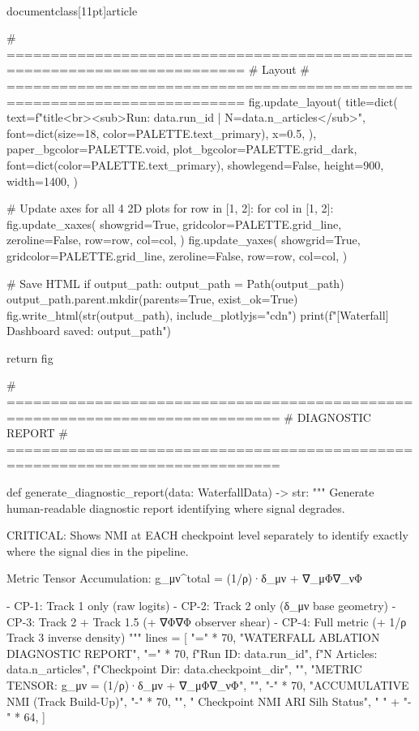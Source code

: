 \\documentclass[11pt]{article}
\begin{document}
\begin{CodeBlock}
    # =========================================================================
    # Layout
    # =========================================================================
    fig.update_layout(
        title=dict(
            text=f"{title}<br><sub>Run: {data.run_id} | N={data.n_articles}</sub>",
            font=dict(size=18, color=PALETTE.text_primary),
            x=0.5,
        ),
        paper_bgcolor=PALETTE.void,
        plot_bgcolor=PALETTE.grid_dark,
        font=dict(color=PALETTE.text_primary),
        showlegend=False,
        height=900,
        width=1400,
    )

    # Update axes for all 4 2D plots
    for row in [1, 2]:
        for col in [1, 2]:
            fig.update_xaxes(
                showgrid=True,
                gridcolor=PALETTE.grid_line,
                zeroline=False,
                row=row,
                col=col,
            )
            fig.update_yaxes(
                showgrid=True,
                gridcolor=PALETTE.grid_line,
                zeroline=False,
                row=row,
                col=col,
            )

    # Save HTML
    if output_path:
        output_path = Path(output_path)
        output_path.parent.mkdir(parents=True, exist_ok=True)
        fig.write_html(str(output_path), include_plotlyjs="cdn")
        print(f"[Waterfall] Dashboard saved: {output_path}")

    return fig


# =============================================================================
# DIAGNOSTIC REPORT
# =============================================================================

def generate_diagnostic_report(data: WaterfallData) -> str:
    """
    Generate human-readable diagnostic report identifying where signal degrades.

    CRITICAL: Shows NMI at EACH checkpoint level separately to identify
    exactly where the signal dies in the pipeline.

    Metric Tensor Accumulation:
    g_μν^total = (1/ρ)·δ_μν + ∇_μΦ∇_νΦ

    - CP-1: Track 1 only (raw logits)
    - CP-2: Track 2 only (δ_μν base geometry)
    - CP-3: Track 2 + Track 1.5 (+ ∇Φ∇Φ observer shear)
    - CP-4: Full metric (+ 1/ρ Track 3 inverse density)
    """
    lines = [
        "=" * 70,
        "WATERFALL ABLATION DIAGNOSTIC REPORT",
        "=" * 70,
        f"Run ID: {data.run_id}",
        f"N Articles: {data.n_articles}",
        f"Checkpoint Dir: {data.checkpoint_dir}",
        "",
        "METRIC TENSOR: g_μν = (1/ρ)·δ_μν + ∇_μΦ∇_νΦ",
        "",
        "-" * 70,
        "ACCUMULATIVE NMI (Track Build-Up)",
        "-" * 70,
        "",
        "  Checkpoint                       NMI      ARI      Silh     Status",
        "  " + "-" * 64,
    ]


\end{CodeBlock}
\end{document}
